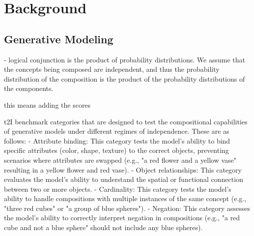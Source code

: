 \chapter{Background}
\label{chap:background}

\section{Generative Modeling}
\label{sec:deep_generative_models}


- logical conjunction is the product of probability distributions. We assume that the concepts being composed are independent, and thus the probability distribution of the composition is the product of the probability distributions of the components. 

this means adding the scores 


t2I benchmark categories that are designed to test the compositional capabilities of generative models under different regimes of independence.
These are as follows:
- Attribute binding: This category tests the model's ability to bind specific attributes (color, shape, texture) to the correct objects, preventing scenarios where attributes are swapped (e.g., "a red flower and a yellow vase" resulting in a yellow flower and red vase).
- Object relationships: This category evaluates the model's ability to understand the spatial or functional connection between two or more objects.
- Cardinality: This category tests the model's ability to handle compositions with multiple instances of the same concept (e.g., "three red cubes" or "a group of blue spheres").
- Negation: This category assesses the model's ability to correctly interpret negation in compositions (e.g., "a red cube and not a blue sphere" should not include any blue spheres).




